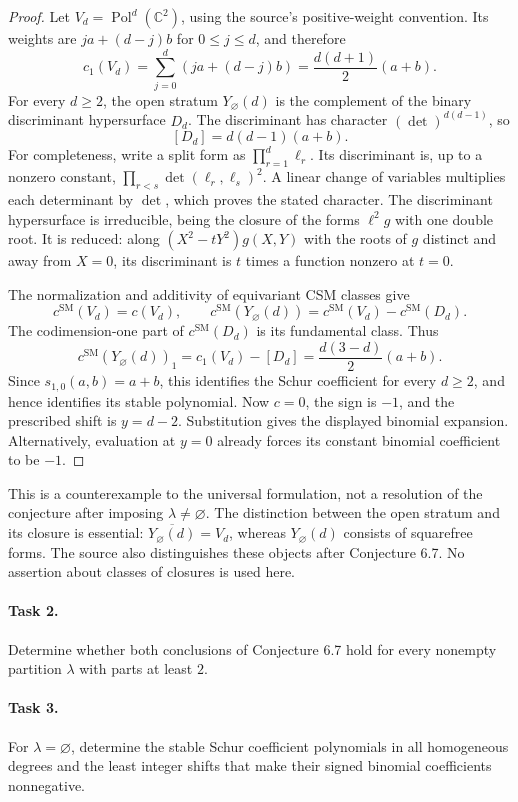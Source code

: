 \documentclass[11pt]{article}
\newcommand{\cSM}{c^{\mathrm{SM}}}
\begin{document}
\begin{proof}
Let $V_d=\operatorname{Pol}^d(\mathbb C^2)$, using the source's
positive-weight convention. Its weights are $ja+(d-j)b$ for
$0\leq j\leq d$, and therefore
\[
 c_1(V_d)=\sum_{j=0}^d(ja+(d-j)b)
          =\frac{d(d+1)}2(a+b).
\]
For every $d\geq2$, the open stratum $Y_\varnothing(d)$ is the
complement of the binary discriminant hypersurface $D_d$.
The discriminant has character $(\det)^{d(d-1)}$, so
\[
 [D_d]=d(d-1)(a+b).
\]
For completeness, write a split form as $\prod_{r=1}^d\ell_r$.
Its discriminant is, up to a nonzero constant,
$\prod_{r<s}\det(\ell_r,\ell_s)^2$. A linear change of variables
multiplies each determinant by $\det$, which proves the stated
character. The discriminant hypersurface is irreducible, being the
closure of the forms $\ell^2g$ with one double root. It is reduced:
along $(X^2-tY^2)g(X,Y)$ with the roots of $g$ distinct and away
from $X=0$, its discriminant is $t$ times a function nonzero at $t=0$.

The normalization and additivity of equivariant CSM classes give
\[
 \cSM(V_d)=c(V_d),\qquad
 \cSM(Y_\varnothing(d))=\cSM(V_d)-\cSM(D_d).
\]
The codimension-one part of $\cSM(D_d)$ is its fundamental class.
Thus
\[
 \cSM(Y_\varnothing(d))_1
   =c_1(V_d)-[D_d]=\frac{d(3-d)}2(a+b).
\]
Since $s_{1,0}(a,b)=a+b$, this identifies the Schur coefficient for
every $d\geq2$, and hence identifies its stable polynomial.
Now $c=0$, the sign is $-1$, and the prescribed shift is $y=d-2$.
Substitution gives the displayed binomial expansion.
Alternatively, evaluation at $y=0$ already forces its constant
binomial coefficient to be $-1$.
\end{proof}

This is a counterexample to the universal formulation, not a resolution
of the conjecture after imposing $\lambda\ne\varnothing$.
The distinction between the open stratum and its closure is essential:
$\overline{Y_\varnothing(d)}=V_d$, whereas $Y_\varnothing(d)$ consists
of squarefree forms. The source also distinguishes these objects after
Conjecture 6.7. No assertion about classes of closures is used here.

\paragraph{Task 2.}
Determine whether both conclusions of Conjecture 6.7 hold for every
nonempty partition $\lambda$ with parts at least $2$.

\paragraph{Task 3.}
For $\lambda=\varnothing$, determine the stable Schur coefficient
polynomials in all homogeneous degrees and the least integer shifts
that make their signed binomial coefficients nonnegative.
\end{document}
